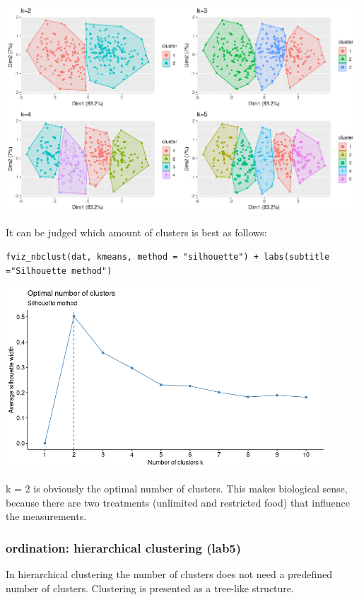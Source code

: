 \documentclass{article}
\begin{document}
\begin{center}
    \includegraphics[width = 0.99\textwidth]{lab5/kmeans.png}
\end{center}

It can be judged which amount of clusters is best as follows:

\begin{lstlisting}
fviz_nbclust(dat, kmeans, method = "silhouette") + labs(subtitle ="Silhouette method")
\end{lstlisting}

\begin{center}
    \includegraphics[width = 0.9\textwidth]{lab5/kmeans_ranking.png}
\end{center}

k = 2 is obviously the optimal number of clusters. This makes biological sense, because there are two treatments (unlimited and restricted food) that influence the measurements.

\subsubsection{ordination: hierarchical clustering (lab5)}
In hierarchical clustering the number of clusters does not need a predefined number of clusters. Clustering is presented as a tree-like structure.
\end{document}
